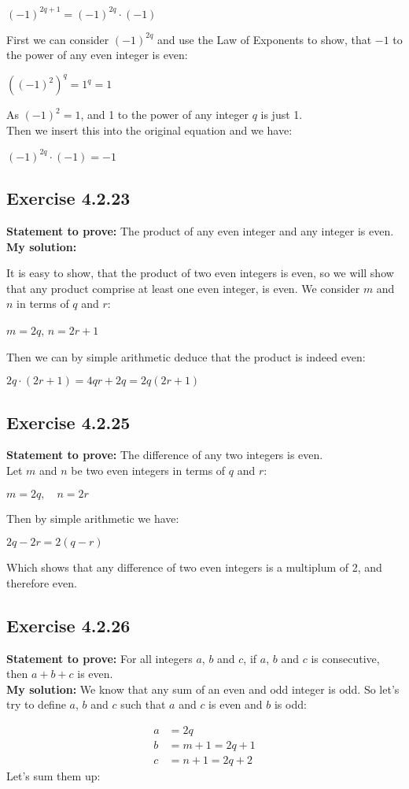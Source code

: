 \documentclass{article}
\newcommand{\cent}[1]{\begin{center}#1\end{center}}
\newcommand{\mAlign}[1]{\begin{align*}#1\end{align*}}
\newcommand{\Prove}{\textbf{Statement to prove: }}
\newcommand{\Solution}{\textbf{My solution: }}
\newcommand{\QED}{\boxed{}}
\newcommand{\Exercise}[1]{\subsection{Exercise #1}}
\begin{document}
	\cent{$(-1)^{2q + 1} = (-1)^{2q} \cdot (-1)$}
	
	First we can consider $(-1)^{2q}$ and use the Law of Exponents to show, that $-1$ to the power of any even integer is even:
	
	\cent{$((-1)^2)^q = 1^q = 1$}
	
	As $(-1)^2 = 1$, and 1 to the power of any integer $q$ is just 1.\\
	
	Then we insert this into the original equation and we have:
	
	\cent{$(-1)^{2q} \cdot (-1) = -1$}
	
	\QED
	
	\Exercise{4.2.23}
	
	\Prove
	The product of any even integer and any integer is even.\\
	
	\Solution
	
	It is easy to show, that the product of two even integers is even, so we will show that any product comprise at least one even integer, is even. We consider $m$ and $n$ in terms of $q$ and $r$:
	
	\cent{$m = 2q$, \quad $n = 2r+1$}
	
	Then we can by simple arithmetic deduce that the product is indeed even:
	
	\cent{$ 2q \cdot (2r+1) = 4qr+2q = 2q(2r+1) $}
	
	\QED
	
	\Exercise{4.2.25}
	
	\Prove
	The difference of any two integers is even.\\
	
	Let $m$ and $n$ be two even integers in terms of $q$ and $r$: 
	
	\cent{$m = 2q, \quad n = 2r$}
	
	Then by simple arithmetic we have:
	\cent{$2q - 2r = 2(q-r)$}
	
	Which shows that any difference of two even integers is a multiplum of 2, and therefore even.
	\QED
	
	\Exercise{4.2.26}
	\Prove
	For all integers $a$, $b$ and $c$, if $a$, $b$ and $c$ is consecutive, then $a+b+c$ is even.\\
	
	\Solution
	We know that any sum of an even and odd integer is odd. So let's try to define $a$, $b$ and $c$ such that $a$ and $c$ is even and $b$ is odd:
	
	\mAlign{a &= 2q\\
					b &= m + 1 = 2q+1 \\
					c &= n + 1 = 2q+2}
	Let's sum them up:
	
\end{document}
